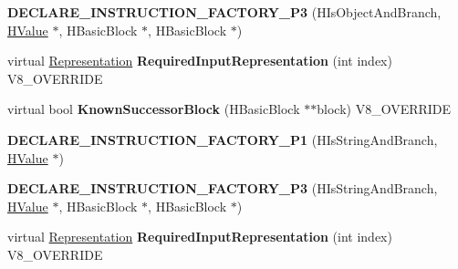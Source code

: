 \begin{DoxyCompactItemize}
\item 
\hypertarget{classv8_1_1internal_1_1_v8___f_i_n_a_l_aac408e3d13ae4f9c7c84daa13b7a73bc}{}{\bfseries D\+E\+C\+L\+A\+R\+E\+\_\+\+I\+N\+S\+T\+R\+U\+C\+T\+I\+O\+N\+\_\+\+F\+A\+C\+T\+O\+R\+Y\+\_\+\+P3} (H\+Is\+Object\+And\+Branch, \hyperlink{classv8_1_1internal_1_1_h_value}{H\+Value} $\ast$, H\+Basic\+Block $\ast$, H\+Basic\+Block $\ast$)\label{classv8_1_1internal_1_1_v8___f_i_n_a_l_aac408e3d13ae4f9c7c84daa13b7a73bc}

\item 
\hypertarget{classv8_1_1internal_1_1_v8___f_i_n_a_l_a6c6d1f37f40b113d8f4062f1ffff7215}{}virtual \hyperlink{classv8_1_1internal_1_1_representation}{Representation} {\bfseries Required\+Input\+Representation} (int index) V8\+\_\+\+O\+V\+E\+R\+R\+I\+D\+E\label{classv8_1_1internal_1_1_v8___f_i_n_a_l_a6c6d1f37f40b113d8f4062f1ffff7215}

\item 
\hypertarget{classv8_1_1internal_1_1_v8___f_i_n_a_l_a85ba341b22db01ee3cd7145d9f8e9b99}{}virtual bool {\bfseries Known\+Successor\+Block} (H\+Basic\+Block $\ast$$\ast$block) V8\+\_\+\+O\+V\+E\+R\+R\+I\+D\+E\label{classv8_1_1internal_1_1_v8___f_i_n_a_l_a85ba341b22db01ee3cd7145d9f8e9b99}

\item 
\hypertarget{classv8_1_1internal_1_1_v8___f_i_n_a_l_a2618a5e256d886e3e8ef9df0dd8b6681}{}{\bfseries D\+E\+C\+L\+A\+R\+E\+\_\+\+I\+N\+S\+T\+R\+U\+C\+T\+I\+O\+N\+\_\+\+F\+A\+C\+T\+O\+R\+Y\+\_\+\+P1} (H\+Is\+String\+And\+Branch, \hyperlink{classv8_1_1internal_1_1_h_value}{H\+Value} $\ast$)\label{classv8_1_1internal_1_1_v8___f_i_n_a_l_a2618a5e256d886e3e8ef9df0dd8b6681}

\item 
\hypertarget{classv8_1_1internal_1_1_v8___f_i_n_a_l_a23ab8d1dbe3d5262a96d115be8d39be4}{}{\bfseries D\+E\+C\+L\+A\+R\+E\+\_\+\+I\+N\+S\+T\+R\+U\+C\+T\+I\+O\+N\+\_\+\+F\+A\+C\+T\+O\+R\+Y\+\_\+\+P3} (H\+Is\+String\+And\+Branch, \hyperlink{classv8_1_1internal_1_1_h_value}{H\+Value} $\ast$, H\+Basic\+Block $\ast$, H\+Basic\+Block $\ast$)\label{classv8_1_1internal_1_1_v8___f_i_n_a_l_a23ab8d1dbe3d5262a96d115be8d39be4}

\item 
\hypertarget{classv8_1_1internal_1_1_v8___f_i_n_a_l_a6c6d1f37f40b113d8f4062f1ffff7215}{}virtual \hyperlink{classv8_1_1internal_1_1_representation}{Representation} {\bfseries Required\+Input\+Representation} (int index) V8\+\_\+\+O\+V\+E\+R\+R\+I\+D\+E\label{classv8_1_1internal_1_1_v8___f_i_n_a_l_a6c6d1f37f40b113d8f4062f1ffff7215}


\end{DoxyCompactItemize}
